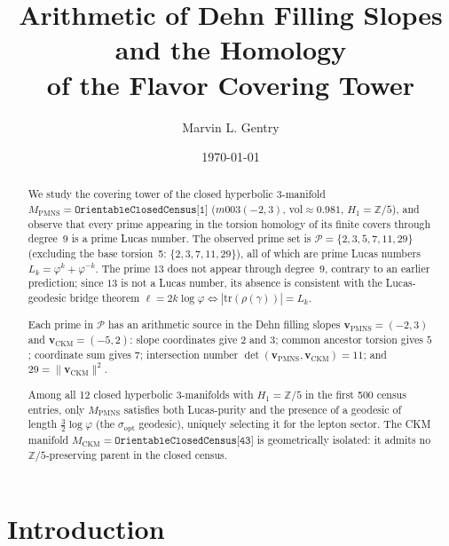 \documentclass[12pt]{article}
\title{Arithmetic of Dehn Filling Slopes and the Homology\\
of the Flavor Covering Tower}
\author{Marvin L. Gentry}
\affil{Independent Researcher, Seattle, WA\\
\texttt{drmlgentry@protonmail.com}\\
ORCID: 0009-0006-4550-2663}
\date{\today}
\theoremstyle{definition}
\begin{document}
\maketitle

\begin{abstract}
We study the covering tower of the closed hyperbolic 3-manifold
$M_{\mathrm{PMNS}} = \texttt{OrientableClosedCensus[1]}$
($m003(-2,3)$, vol$\approx0.981$, $H_1=\mathbb{Z}/5$), and observe
that every prime appearing in the torsion homology of its finite covers
through degree~9 is a prime Lucas number. The observed prime set is
$\mathcal{P} = \{2,3,5,7,11,29\}$ (excluding the base torsion~5:
$\{2,3,7,11,29\}$), all of which are prime Lucas numbers
$L_k = \varphi^k + \varphi^{-k}$.
The prime $13$ does not appear through degree~9, contrary to an earlier
prediction; since $13$ is not a Lucas number, its absence is consistent
with the Lucas-geodesic bridge theorem $\ell = 2k\log\varphi
\Leftrightarrow |\mathrm{tr}(\rho(\gamma))| = L_k$.

Each prime in $\mathcal{P}$ has an arithmetic source in the Dehn
filling slopes $\mathbf{v}_{\mathrm{PMNS}} = (-2,3)$ and
$\mathbf{v}_{\mathrm{CKM}} = (-5,2)$: slope coordinates give $2$
and $3$; common ancestor torsion gives $5$; coordinate sum gives $7$;
intersection number $\det(\mathbf{v}_{\mathrm{PMNS}},
\mathbf{v}_{\mathrm{CKM}}) = 11$; and $29 = \|\mathbf{v}_{\mathrm{CKM}}\|^2$.

Among all 12 closed hyperbolic 3-manifolds with $H_1=\mathbb{Z}/5$
in the first 500 census entries, only $M_{\mathrm{PMNS}}$ satisfies
both Lucas-purity and the presence of a geodesic of length
$\tfrac{3}{2}\log\varphi$ (the $\sigma_{\mathrm{opt}}$ geodesic),
uniquely selecting it for the lepton sector.
The CKM manifold $M_{\mathrm{CKM}} = \texttt{OrientableClosedCensus[43]}$
is geometrically isolated: it admits no $\mathbb{Z}/5$-preserving
parent in the closed census.
\end{abstract}

\section{Introduction}
\end{document}
